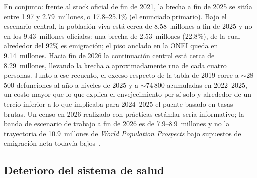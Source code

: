\documentclass[11pt,a4paper]{article}
\begin{document}
En conjunto: frente al stock oficial de fin de 2021, la brecha a fin de 2025 se sitúa entre 1.97 y 2.79~millones, o 17.8--25.1\% (el enunciado primario).
Bajo el escenario central, la población viva está cerca de 8.58~millones a fin de 2025 y no en los 9.43~millones oficiales: una brecha de 2.53~millones (22.8\%), de la cual alrededor del 92\% es emigración; el piso anclado en la ONEI queda en 9.14~millones.
Hacia fin de 2026 la continuación central está cerca de 8.29~millones, llevando la brecha a aproximadamente una de cada cuatro personas.
Junto a ese recuento, el exceso respecto de la tabla de 2019 corre a $\sim$28\,500 defunciones al año a niveles de 2025 y a $\sim$74\,800 acumuladas en 2022--2025, un costo mayor que lo que explica el envejecimiento por sí solo y alrededor de un tercio inferior a lo que implicaba para 2024--2025 el puente basado en tasas brutas.
Un censo en 2026 realizado con prácticas estándar sería informativo; la banda de escenario de trabajo a fin de 2026 es de 7.9--8.9~millones y no la trayectoria de 10.9~millones de \emph{World Population Prospects} bajo supuestos de emigración neta todavía bajos~\citep{un_wpp}.


\subsection{Deterioro del sistema de salud}
\end{document}
